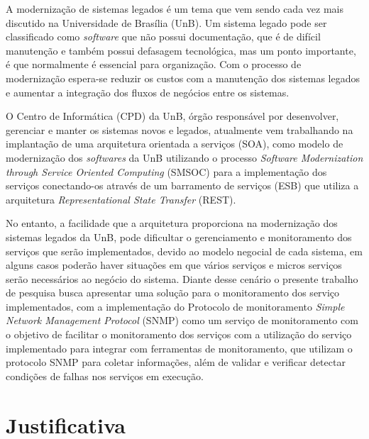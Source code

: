 \label{Introducao}

A modernização de sistemas legados é um tema que vem sendo cada vez mais discutido na Universidade de Brasília (UnB). Um sistema legado pode ser classificado como \textit{software} que não possui documentação, que é de difícil manutenção e também possui defasagem tecnológica, mas um ponto importante, é que normalmente é essencial para organização. Com o processo de modernização espera-se reduzir os custos com a manutenção dos sistemas legados e aumentar a integração dos fluxos de negócios entre os sistemas\cite{Agilar}.

O Centro de Informática (CPD) da UnB, órgão responsável por desenvolver, gerenciar e manter os sistemas novos e legados, atualmente vem trabalhando na implantação de uma arquitetura orientada a serviços (SOA), como modelo de modernização dos \textit{softwares} da UnB utilizando o processo  \textit{Software Modernization through Service Oriented Computing} (SMSOC) para a implementação dos serviços conectando-os  através de um barramento de serviços (ESB) que utiliza a arquitetura \textit{Representational State Transfer} (REST).

No entanto, a facilidade que a arquitetura proporciona na modernização dos sistemas legados da UnB, pode dificultar o gerenciamento e monitoramento dos serviços que serão implementados, devido ao modelo negocial de cada sistema, em alguns casos poderão haver situações em que vários serviços e micros serviços serão necessários ao negócio do sistema. Diante desse cenário o presente trabalho de pesquisa busca apresentar uma solução para o monitoramento dos serviço implementados, com a implementação do Protocolo de monitoramento \textit{Simple Network Management Protocol} (SNMP) como um serviço de monitoramento com o objetivo de facilitar o monitoramento dos serviços com a utilização do serviço implementado para integrar com ferramentas de monitoramento, que utilizam o protocolo SNMP para coletar informações, além de validar e verificar detectar condições de falhas nos serviços em execução.


\section{Justificativa}

